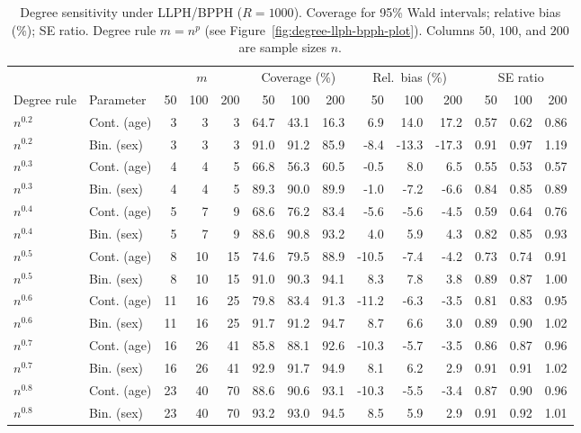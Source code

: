 \documentclass[5p,lefttitle]{elsarticle}
\begin{document}
{\begin{table}[!h]
\centering
\scriptsize
\setlength{\tabcolsep}{2.6pt}
\renewcommand{\arraystretch}{1.05}
\caption{\label{tab:degree-llph-bpph}
Degree sensitivity under LLPH/BPPH (\(R=1000\)). Coverage for 95\% Wald intervals; relative bias (\%); SE ratio. Degree rule \(m=n^p\) (see Figure~\ref{fig:degree-llph-bpph-plot}). Columns \(50\), \(100\), and \(200\) are sample sizes \(n\).}
\begin{tabular}{@{}ll*{12}{r}@{}}
\toprule
&&
\multicolumn{3}{c}{\(m\)} &
\multicolumn{3}{c}{Coverage (\%)} &
\multicolumn{3}{c}{Rel.\ bias (\%)} &
\multicolumn{3}{c}{SE ratio} \\
\cmidrule(lr){3-5}
\cmidrule(lr){6-8}
\cmidrule(lr){9-11}
\cmidrule(l){12-14}
Degree rule & Parameter & 50 & 100 & 200 & 50 & 100 & 200 & 50 & 100 & 200 & 50 & 100 & 200 \\
\midrule
\(n^{0.2}\) & Cont. (age) &  3 &  3 &  3 & 64.7 & 43.1 & 16.3 &  6.9 &  14.0 &  17.2 & 0.57 & 0.62 & 0.86 \\
\(n^{0.2}\) & Bin. (sex) &  3 &  3 &  3 & 91.0 & 91.2 & 85.9 & -8.4 & -13.3 & -17.3 & 0.91 & 0.97 & 1.19 \\
\(n^{0.3}\) & Cont. (age) &  4 &  4 &  5 & 66.8 & 56.3 & 60.5 & -0.5 &  8.0 &  6.5 & 0.55 & 0.53 & 0.57 \\
\(n^{0.3}\) & Bin. (sex) &  4 &  4 &  5 & 89.3 & 90.0 & 89.9 & -1.0 & -7.2 & -6.6 & 0.84 & 0.85 & 0.89 \\
\(n^{0.4}\) & Cont. (age) &  5 &  7 &  9 & 68.6 & 76.2 & 83.4 & -5.6 & -5.6 & -4.5 & 0.59 & 0.64 & 0.76 \\
\(n^{0.4}\) & Bin. (sex) &  5 &  7 &  9 & 88.6 & 90.8 & 93.2 &  4.0 &  5.9 &  4.3 & 0.82 & 0.85 & 0.93 \\
\(n^{0.5}\) & Cont. (age) &  8 & 10 & 15 & 74.6 & 79.5 & 88.9 & -10.5 & -7.4 & -4.2 & 0.73 & 0.74 & 0.91 \\
\(n^{0.5}\) & Bin. (sex) &  8 & 10 & 15 & 91.0 & 90.3 & 94.1 &  8.3 &  7.8 &  3.8 & 0.89 & 0.87 & 1.00 \\
\(n^{0.6}\) & Cont. (age) & 11 & 16 & 25 & 79.8 & 83.4 & 91.3 & -11.2 & -6.3 & -3.5 & 0.81 & 0.83 & 0.95 \\
\(n^{0.6}\) & Bin. (sex) & 11 & 16 & 25 & 91.7 & 91.2 & 94.7 &  8.7 &  6.6 &  3.0 & 0.89 & 0.90 & 1.02 \\
\(n^{0.7}\) & Cont. (age) & 16 & 26 & 41 & 85.8 & 88.1 & 92.6 & -10.3 & -5.7 & -3.5 & 0.86 & 0.87 & 0.96 \\
\(n^{0.7}\) & Bin. (sex) & 16 & 26 & 41 & 92.9 & 91.7 & 94.9 &  8.1 &  6.2 &  2.9 & 0.91 & 0.91 & 1.02 \\
\(n^{0.8}\) & Cont. (age) & 23 & 40 & 70 & 88.6 & 90.6 & 93.1 & -10.3 & -5.5 & -3.4 & 0.87 & 0.90 & 0.96 \\
\(n^{0.8}\) & Bin. (sex) & 23 & 40 & 70 & 93.2 & 93.0 & 94.5 &  8.5 &  5.9 &  2.9 & 0.91 & 0.92 & 1.01 \\
\bottomrule
\end{tabular}
\end{table}

}
\end{document}
